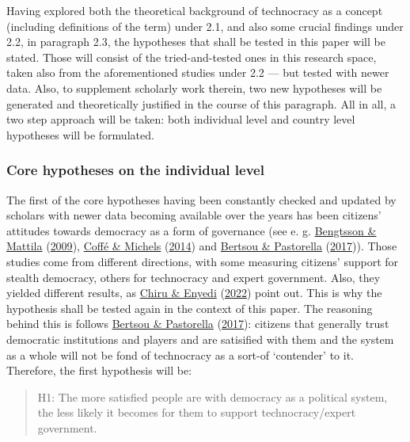 \documentclass[
  12pt,
  english,
]{article}
\begin{document}
Having explored both the theoretical background of technocracy as a
concept (including definitions of the term) under 2.1, and also some
crucial findings under 2.2, in paragraph 2.3, the hypotheses that shall
be tested in this paper will be stated. Those will consist of the
tried-and-tested ones in this research space, taken also from the
aforementioned studies under 2.2 --- but tested with newer data. Also,
to supplement scholarly work therein, two new hypotheses will be
generated and theoretically justified in the course of this paragraph.
All in all, a two step approach will be taken: both individual level and
country level hypotheses will be formulated.

\hypertarget{core-hypotheses-on-the-individual-level}{%
\subsubsection{Core hypotheses on the individual
level}\label{core-hypotheses-on-the-individual-level}}

The first of the core hypotheses having been constantly checked and
updated by scholars with newer data becoming available over the years
has been citizens' attitudes towards democracy as a form of governance
(see e. g. \protect\hyperlink{ref-bengtsson2009direct}{Bengtsson \&
Mattila} (\protect\hyperlink{ref-bengtsson2009direct}{2009}),
\protect\hyperlink{ref-coffe2014education}{Coffé \& Michels}
(\protect\hyperlink{ref-coffe2014education}{2014}) and
\protect\hyperlink{ref-bertsou2017technocratic}{Bertsou \& Pastorella}
(\protect\hyperlink{ref-bertsou2017technocratic}{2017})). Those studies
come from different directions, with some measuring citizens' support
for stealth democracy, others for technocracy and expert government.
Also, they yielded different results, as
\protect\hyperlink{ref-chiru2022wants}{Chiru \& Enyedi}
(\protect\hyperlink{ref-chiru2022wants}{2022}) point out. This is why
the hypothesis shall be tested again in the context of this paper. The
reasoning behind this is follows
\protect\hyperlink{ref-bertsou2017technocratic}{Bertsou \& Pastorella}
(\protect\hyperlink{ref-bertsou2017technocratic}{2017}): citizens that
generally trust democratic institutions and players and are satisified
with them and the system as a whole will not be fond of technocracy as a
sort-of `contender' to it. Therefore, the first hypothesis will be:

\begin{quote}
H1: The more satisfied people are with democracy as a political system,
the less likely it becomes for them to support technocracy/expert
government.
\end{quote}
\end{document}
